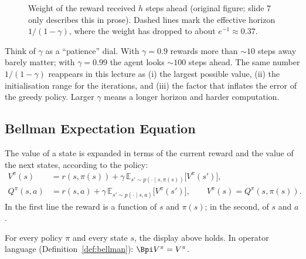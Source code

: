 \documentclass[11pt,a4paper]{article}
\newcommand{\E}{\mathbb{E}}
\theoremstyle{plain}
\theoremstyle{definition}
\theoremstyle{remark}
\begin{document}
\begin{figure}[htbp]
\centering
{}
\caption{Weight of the reward received $h$ steps ahead (original figure; slide 7 only describes this in prose). Dashed lines mark the effective horizon $1/(1-\gamma)$, where the weight has dropped to about $e^{-1}\approx0.37$.}
\label{fig:discount}
\end{figure}

\begin{intuition}
Think of $\gamma$ as a ``patience'' dial. With $\gamma=0.9$ rewards more than $\sim10$ steps away barely matter; with $\gamma=0.99$ the agent looks $\sim100$ steps ahead. The same number $1/(1-\gamma)$ reappears in this lecture as (i) the largest possible value, (ii) the initialisation range for the iterations, and (iii) the factor that inflates the error of the greedy policy. Larger $\gamma$ means a longer horizon and harder computation.
\end{intuition}

\subsection{Bellman Expectation Equation }
The value of a state is expanded in terms of the current reward and the value of the next states, according to the policy:
\begin{align*}
V^\pi(s)&=r(s,\pi(s))+\gamma\,\E_{s'\sim p(\cdot\mid s,\pi(s))}\big[V^\pi(s')\big],\\
Q^\pi(s,a)&=r(s,a)+\gamma\,\E_{s'\sim p(\cdot\mid s,a)}\big[V^\pi(s')\big],\qquad V^\pi(s)=Q^\pi(s,\pi(s)).
\end{align*}
In the first line the reward is a function of $s$ and $\pi(s)$; in the second, of $s$ and $a$.

\begin{fact}\label{fact:bexp}
For every policy $\pi$ and every state $s$, the display above holds. In operator language (Definition~\ref{def:bellman}): $\Bpi V^\pi=V^\pi$.
\end{fact}
\end{document}
